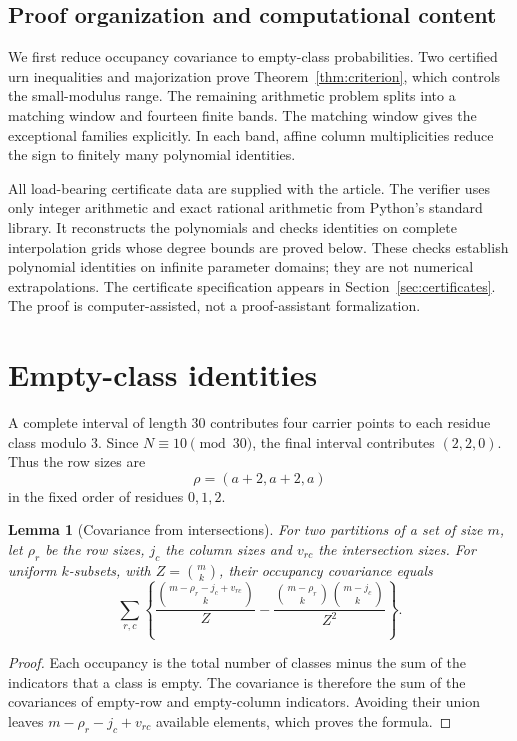 \documentclass[11pt,a4paper]{article}
\newtheorem{lemma}[theorem]{Lemma}
\theoremstyle{remark}
\numberwithin{equation}{section}
\begin{document}
\subsection{Proof organization and computational content}
We first reduce occupancy covariance to empty-class probabilities.
Two certified urn inequalities and majorization prove
Theorem~\ref{thm:criterion}, which controls the small-modulus range.
The remaining arithmetic problem splits into a matching window and
fourteen finite bands. The matching window gives the exceptional
families explicitly. In each band, affine column multiplicities reduce
the sign to finitely many polynomial identities.

All load-bearing certificate data are supplied with the article.
The verifier uses only integer arithmetic and exact rational arithmetic
from Python's standard library. It reconstructs the polynomials and
checks identities on complete interpolation grids whose degree bounds
are proved below. These checks establish polynomial identities on
infinite parameter domains; they are not numerical extrapolations.
The certificate specification appears in Section~\ref{sec:certificates}.
The proof is computer-assisted, not a proof-assistant formalization.

\section{Empty-class identities}\label{sec:empty}
A complete interval of length \(30\) contributes four carrier points
to each residue class modulo \(3\). Since \(N\equiv10\pmod{30}\),
the final interval contributes \((2,2,0)\). Thus the row sizes are
\begin{equation}\label{eq:rows}
 \rho=(a+2,a+2,a)
\end{equation}
in the fixed order of residues \(0,1,2\).

\begin{lemma}[Covariance from intersections]\label{lem:empty}
For two partitions of a set of size \(m\), let \(\rho_r\) be the row
sizes, \(j_c\) the column sizes and \(v_{rc}\) the intersection sizes.
For uniform \(k\)-subsets, with \(Z=\binom mk\), their occupancy
covariance equals
\begin{equation}\label{eq:empty}
 \sum_{r,c}\left\{
 \frac{\binom{m-\rho_r-j_c+v_{rc}}k}{Z}
 -\frac{\binom{m-\rho_r}k\binom{m-j_c}k}{Z^2}\right\}.
\end{equation}
\end{lemma}
\begin{proof}
Each occupancy is the total number of classes minus the sum of the
indicators that a class is empty. The covariance is therefore the sum
of the covariances of empty-row and empty-column indicators.
Avoiding their union leaves \(m-\rho_r-j_c+v_{rc}\) available elements,
which proves the formula.
\end{proof}
\end{document}
